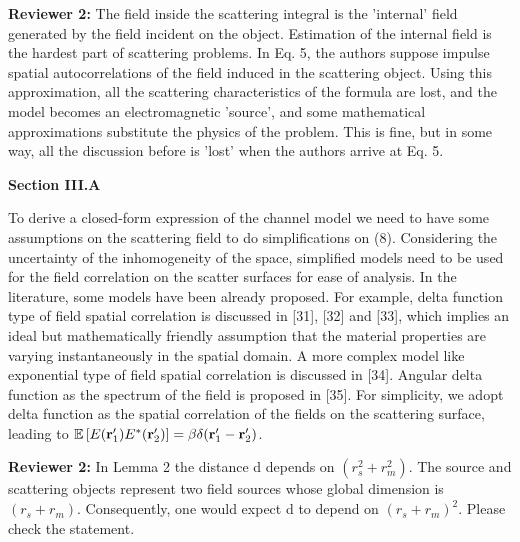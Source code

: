 \documentclass[a4paper,12pt]{article}
\begin{document}
\textbf{Reviewer 2:}
The field inside the scattering integral is the 'internal' field generated by the field incident on the object. Estimation of the internal field is the hardest part of scattering problems. In Eq. 5, the authors suppose impulse spatial autocorrelations of the field induced in the scattering object. Using this approximation, all the scattering characteristics of the formula are lost, and the model becomes an electromagnetic 'source', and some mathematical approximations substitute the physics of the problem. This is fine, but in some way, all the discussion before is 'lost' when the authors arrive at Eq. 5.

{}

\begin{framed}
	{\bf Section III.A}

    To derive a closed-form expression of the channel model we need to have some assumptions on the scattering field to do simplifications on (8). {\color{red} Considering the uncertainty of the inhomogeneity of the space, simplified models need to be used for the field correlation on the scatter surfaces for ease of analysis. In the literature, some models have been already proposed. For example, delta function type of field spatial correlation is discussed in [31], [32] and [33], which implies an ideal but mathematically friendly assumption that the material properties are varying instantaneously in the spatial domain. A more complex model like exponential type of field spatial correlation is discussed in [34]. Angular delta function as the spectrum of the field is proposed in [35]. For simplicity, we adopt delta function as the spatial correlation of the fields on the scattering surface, leading to $\mathbb{E}\left[ E({\bf r}_1')E^{*}({\bf r}_2') \right] = \beta \delta({\bf r}_1'-{\bf r}_2')$.}

\end{framed}

\textbf{Reviewer 2:}
In Lemma 2 the distance d depends on $(r_s^2+r_m^2)$. The source and scattering objects represent two field sources whose global dimension is $(r_s+r_m)$. Consequently, one would expect d to depend on $(r_s+r_m)^2$. Please check the statement.
\end{document}
